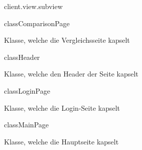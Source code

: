 \begin{texdocpackage}{client.view.subview}
\label{texdoclet:edu.kit.informatik.studyplan.client.view.subview}

\begin{texdocclass}{class}{ComparisonPage}
\label{texdoclet:edu.kit.informatik.studyplan.client.view.subview.ComparisonPage}
\begin{texdocclassintro}
Klasse, welche die Vergleichsseite kapselt\end{texdocclassintro}
\begin{texdocclassconstructors}
\end{texdocclassconstructors}
\end{texdocclass}


\begin{texdocclass}{class}{Header}
\label{texdoclet:edu.kit.informatik.studyplan.client.view.subview.Header}
\begin{texdocclassintro}
Klasse, welche den Header der Seite kapselt\end{texdocclassintro}
\begin{texdocclassconstructors}
\end{texdocclassconstructors}
\end{texdocclass}


\begin{texdocclass}{class}{LoginPage}
\label{texdoclet:edu.kit.informatik.studyplan.client.view.subview.LoginPage}
\begin{texdocclassintro}
Klasse, welche die Login-Seite kapselt\end{texdocclassintro}
\begin{texdocclassconstructors}
\end{texdocclassconstructors}
\end{texdocclass}


\begin{texdocclass}{class}{MainPage}
\label{texdoclet:edu.kit.informatik.studyplan.client.view.subview.MainPage}
\begin{texdocclassintro}
Klasse, welche die Hauptseite kapselt\end{texdocclassintro}
\begin{texdocclassconstructors}
\end{texdocclassconstructors}
\begin{texdocclassmethods}
\end{texdocclassmethods}
\end{texdocclass}



\end{texdocpackage}
